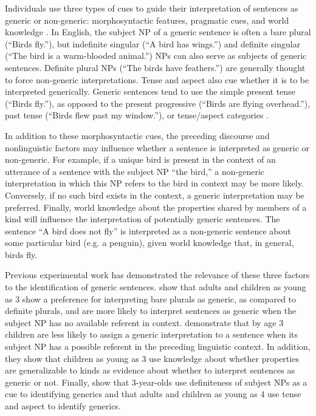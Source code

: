\documentclass[10pt,letterpaper]{article}
\begin{document}
Individuals use three types of cues to guide their interpretation of sentences as generic or non-generic: morphosyntactic features, pragmatic cues, and world knowledge \cite{Cimpian:2008, Cimpian:2011,Gelman:2003}. In English, the subject NP of a generic sentence is often a bare plural (``Birds fly.''), but indefinite singular (``A bird has wings.'') and definite singular (``The bird is a warm-blooded animal.'') NPs can also serve as subjects of generic sentences. Definite plural NPs (``The birds have feathers.'') are generally thought to force non-generic interpretations. Tense and aspect also cue whether it is to be interpreted generically. Generic sentences tend to use the simple present tense (``Birds fly.''), as opposed to the present progressive (``Birds are flying overhead.''), past tense (``Birds flew past my window.''), or tense/aspect categories \cite{Carlson:1977,Krifka:1995,Lyons:1977}.

In addition to these morphosyntactic cues, the preceding discourse and nonlinguistic factors may influence whether a sentence is interpreted as generic or non-generic. For example, if a unique bird is present in the context of an utterance of a sentence with the subject NP ``the bird,'' a non-generic interpretation in which this NP refers to the bird in context may be more likely. Conversely, if no such bird exists in the context, a generic interpretation may be preferred. Finally, world knowledge about the properties shared by members of a kind will influence the interpretation of potentially generic sentences. The sentence ``A bird does not fly'' is interpreted as a non-generic sentence about some particular bird (e.g. a penguin), given world knowledge that, in general, birds fly. 

Previous experimental work has demonstrated the relevance of these three factors to the identification of generic sentences.  show that adults and children as young as 3 show a preference for interpreting bare plurals as generic, as compared to definite plurals, and are more likely to interpret sentences as generic when the subject NP has no available referent in context.  demonstrate that by age 3 children are less likely to assign a generic interpretation to a sentence when its subject NP has a possible referent in the preceding linguistic context. In addition, they show that children as young as 3 use knowledge about whether properties are generalizable to kinds as evidence about whether to interpret sentences as generic or not. Finally,  show that 3-year-olds use definiteness of subject NPs as a cue to identifying generics and that adults and children as young as 4 use tense and aspect to identify generics.
\end{document}
